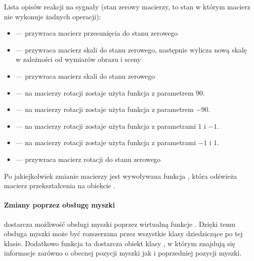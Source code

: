 \par
Lista opisów reakcji na sygnały (stan zerowy macierzy, to stan w którym macierz nie wykonuje żadnych operacji):
\begin{itemize}

    \item {} --- przywraca macierz przesunięcia do stanu zerowego

    \item {} --- przywraca macierz skali do stanu zerowego, następnie wylicza nową skalę w zależności od wymiarów obrazu i sceny

    \item {} --- przywraca macierz skali do stanu zerowego

    \item {} --- na macierzy rotacji zostaje użyta funkcja  z parametrem $90$.

    \item {} --- na macierzy rotacji zostaje użyta funkcja  z parametrem $-90$.

    \item {} --- na macierzy rotacji zostaje użyta funkcja  z parametrami $1$ i $-1$.

    \item {} --- na macierzy rotacji zostaje użyta funkcja  z parametrami $-1$ i $1$.

    \item {} --- przywraca macierz rotacji do stanu zerowego

\end{itemize}
Po jakiejkolwiek zmianie macierzy jest wywoływana funkcja , która odświeża macierz przekształcenia na obiekcie .

\paragraph{Zmiany poprzez obsługę myszki}

\par
{} dostarcza możliwość obsługi myszki poprzez wirtualną funkcje .
Dzięki temu obsługa myszki może być rozszerzana przez wszystkie klasy dziedziczące po tej klasie.
Dodatkowo funkcja ta dostarcza obiekt klasy , w którym znajdują się informacje zarówno o obecnej pozycji myszki jak i poprzedniej pozycji myszki.

